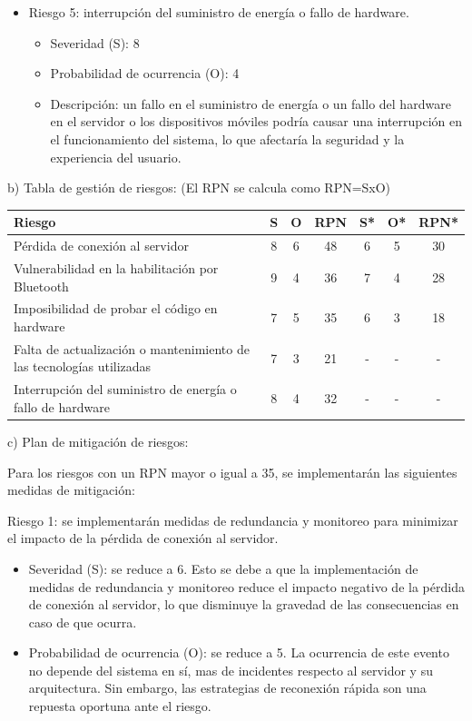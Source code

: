 \documentclass[
11pt, %
codirector, %
]{charter}
\begin{document}
\begin{itemize}
    \item Riesgo 5: interrupción del suministro de energía o fallo de hardware.
    \begin{itemize}
        \item Severidad (S): 8
        \item Probabilidad de ocurrencia (O): 4
        \item Descripción: un fallo en el suministro de energía o un fallo del hardware en el servidor o los dispositivos móviles podría causar una interrupción en el funcionamiento del sistema, lo que afectaría la seguridad y la experiencia del usuario.
    \end{itemize}
\end{itemize}

b) Tabla de gestión de riesgos: (El RPN se calcula como RPN=SxO)
\begin{table}[htpb]
\centering
\begin{tabularx}{\linewidth}{@{}|X|c|c|c|c|c|c|@{}}
\hline
\rowcolor[HTML]{C0C0C0} 
Riesgo & S & O & RPN & S* & O* & RPN* \\ \hline
Pérdida de conexión al servidor & 8 & 6 & 48 & 6 & 5 & 30 \\ \hline
Vulnerabilidad en la habilitación por Bluetooth & 9 & 4 & 36 & 7 & 4 & 28 \\ \hline
Imposibilidad de probar el código en hardware & 7 & 5 & 35 & 6 & 3 & 18 \\ \hline
Falta de actualización o mantenimiento de las tecnologías utilizadas & 7 & 3 & 21 & - & - & - \\ \hline
Interrupción del suministro de energía o fallo de hardware & 8 & 4 & 32 & - & - & - \\ \hline
\end{tabularx}%
\end{table}

c) Plan de mitigación de riesgos:

Para los riesgos con un RPN mayor o igual a 35, se implementarán las siguientes medidas de mitigación:

Riesgo 1: se implementarán medidas de redundancia y monitoreo para minimizar el impacto de la pérdida de conexión al servidor.
\begin{itemize}
    \item Severidad (S): se reduce a 6. Esto se debe a que la implementación de medidas de redundancia y monitoreo reduce el impacto negativo de la pérdida de conexión al servidor, lo que disminuye la gravedad de las consecuencias en caso de que ocurra.
    \item Probabilidad de ocurrencia (O): se reduce a 5. La ocurrencia de este evento no depende del sistema en sí, mas de incidentes respecto al servidor y su arquitectura. Sin embargo, las estrategias de reconexión rápida son una repuesta oportuna ante el riesgo.
\end{itemize}
\end{document}
